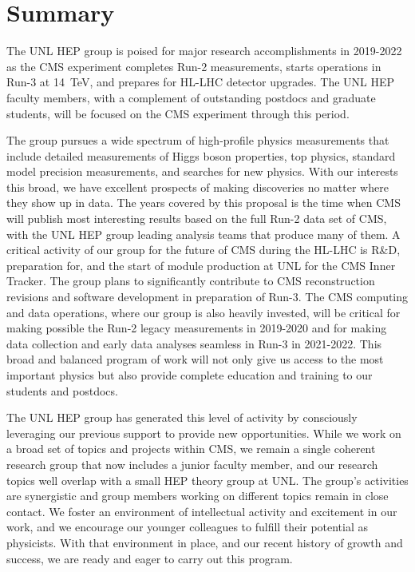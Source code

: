 \section{Summary}

The UNL HEP group is poised for major research accomplishments in 2019-2022 as the CMS experiment completes Run-2 measurements, starts operations in Run-3 at 14~TeV, and prepares for HL-LHC detector upgrades. The UNL HEP faculty members, with a complement of outstanding postdocs and graduate students, will be focused on the CMS experiment through this period.

The group pursues a wide spectrum of high-profile physics measurements that include detailed measurements of Higgs boson properties, top physics, standard model precision measurements, and searches for new physics. With our interests this broad, we have excellent prospects of making discoveries no matter where they show up in data. The years covered by this proposal is the time when CMS will publish most interesting results based on the full Run-2 data set of CMS, with the UNL HEP group leading analysis teams that produce many of them. A critical activity of our group for the future of CMS during the HL-LHC is R\&D, preparation for, and the start of module production at UNL for the CMS Inner Tracker. The group plans to significantly contribute to CMS reconstruction revisions and software development in preparation of Run-3. The CMS computing and data operations, where our group is also heavily invested, will be critical for making possible the Run-2 legacy measurements in 2019-2020 and for making data collection and early data analyses seamless in Run-3 in 2021-2022. This broad and balanced program of work will not only give us access to the most important physics but also provide complete education and training to our students and postdocs.

The UNL HEP group has generated this level of activity by consciously leveraging our previous support to provide new opportunities. While we work on a broad set of topics and projects within CMS, we remain a single coherent research group that now includes a junior faculty member, and our research topics well overlap with a small HEP theory group at UNL. The group's activities are synergistic and group members working on different topics remain in close contact.  We foster an environment of intellectual activity and excitement in our work, and we encourage our younger colleagues to fulfill their potential as physicists. With that environment in place, and our recent history of growth and success, we are ready and eager to carry out this program.
